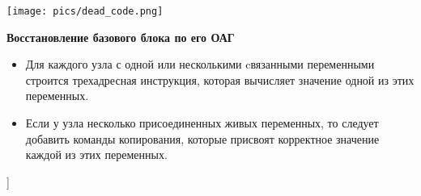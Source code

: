 \texttt{[image: pics/dead\_code.png]}

\textbf{Восстановление базового блока по его ОАГ}
\begin{itemize}
    \item Для каждого узла с одной или несколькими cвязанными переменными строится трехадресная инструкция, которая вычисляет значение одной из этих переменных.
    \item Если у узла несколько присоединенных живых переменных, то следует добавить команды копирования, которые присвоят корректное значение каждой из этих переменных.
\end{itemize}

\bigbreak
[\cite[slides 29-45]{ssg}]

